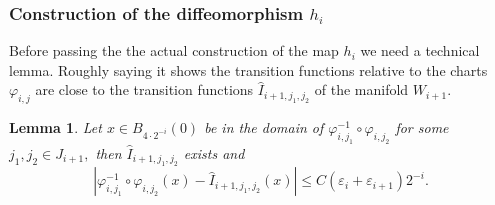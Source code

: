 \documentclass[11pt]{article}
\newcommand{\eps}{\varepsilon}
\renewcommand{\phi}{\varphi}
\theoremstyle{plain}
\newtheorem{lemma}[theorem]{Lemma}
\theoremstyle{definition}
\numberwithin{equation}{section}
\begin{document}
\subsubsection{Construction of the diffeomorphism \texorpdfstring{$h_i$}{hi}}\label{sec:hi build}

Before passing the the actual construction of the map $h_i$ we need a technical lemma. Roughly saying it shows the transition functions relative to the charts $\phi_{i,j}$ are close  to the transition functions $\hat I_{i+1,j_1,j_2}$ of the  manifold $W_{i+1}$.
\begin{lemma}\label{charts2}
	 Let $x \in B_{4\cdot 2^{-i}}(0)$ be in the domain of $\phi_{i,j_1}^{-1}\circ \phi_{i,j_2}$ for some $j_1,j_2 \in J_{i+1},$ then $\hat I_{i+1,j_1,j_2}$ exists and
	\begin{equation}\label{phiphi}
		|\phi_{i,j_1}^{-1}\circ \phi_{i,j_2}(x)- \hat I_{i+1,j_1,j_2}(x)|\le C(\eps_i+\eps_{i+1})2^{-i}.
	\end{equation} 
\end{lemma}
\end{document}
